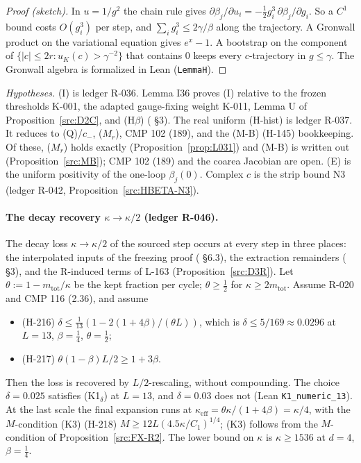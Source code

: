 \begin{proof}[Proof (sketch)]
In $u=1/g^2$ the chain rule gives $\partial\beta_j/\partial u_i=-\tfrac12g_i^3\,\partial\beta_j/\partial g_i$. So a $C^1$ bound costs $O(g_i^3)$ per step, and $\sum_ig_i^3\le2\gamma/\beta$ along the trajectory. A Gronwall product on the variational equation gives $e^x-1$. A bootstrap on the component of $\{|c|\le2r:u_K(c)>\gamma^{-2}\}$ that contains $0$ keeps every $c$-trajectory in $g\le\gamma$. The Gronwall algebra is formalized in Lean (\texttt{LemmaH}).
\end{proof}

\emph{Hypotheses.} (I) is ledger R-036. Lemma I36 proves (I) relative to the frozen thresholds K-001, the adapted gauge-fixing weight K-011, Lemma U of Proposition~\ref{src:D2C}, and (H$\beta$) ( \S3). The real uniform (H-hist) is ledger R-037. It reduces to (Q)/$c_-$, ($M_r$), CMP 102 (189), and the (M-B) (H-145) bookkeeping. Of these, ($M_r$) holds exactly (Proposition~\ref{prop:L031}) and (M-B) is written out (Proposition~\ref{src:MB}); CMP 102 (189) and the coarea Jacobian are open. (E) is the uniform positivity of the one-loop $\beta_j(0)$. Complex $c$ is the strip bound N3 (ledger R-042, Proposition~\ref{src:HBETA-N3}).

\paragraph{The decay recovery $\kappa\to\kappa/2$ (ledger R-046).}

\begin{proposition}\label{src:T2-KAPPA2}
The decay loss $\kappa\to\kappa/2$ of the sourced step occurs at every step in three places: the interpolated inputs of the freezing proof ( \S6.3), the extraction remainders ( \S3), and the R-induced terms of L-163 (Proposition~\ref{src:D3R}). Let $\theta:=1-m_{\mathrm{tot}}/\kappa$ be the kept fraction per cycle; $\theta\ge\tfrac12$ for $\kappa\ge2m_{\mathrm{tot}}$. Assume R-020 and CMP 116 (2.36), and assume
\begin{itemize}
\item[(K1$_\delta$)] (H-216) $\delta\le\tfrac1{13}(1-2(1+4\beta)/(\theta L))$, which is $\delta\le5/169\approx0.0296$ at $L=13$, $\beta=\tfrac14$, $\theta=\tfrac12$;
\item[(K2)] (H-217) $\theta(1-\beta)L/2\ge1+3\beta$.
\end{itemize}
Then the loss is recovered by $L/2$-rescaling, without compounding. The choice $\delta=0.025$ satisfies (K1$_\delta$) at $L=13$, and $\delta=0.03$ does not (Lean \texttt{K1\_numeric\_13}). At the last scale the final expansion runs at $\kappa_{\mathrm{eff}}=\theta\kappa/(1+4\beta)=\kappa/4$, with the $M$-condition (K3) (H-218) $M\ge12L(4.5\kappa/C_1)^{1/4}$; (K3) follows from the $M$-condition of Proposition~\ref{src:FX-R2}. The lower bound on $\kappa$ is $\kappa\ge1536$ at $d=4$, $\beta=\tfrac14$.
\end{proposition}

